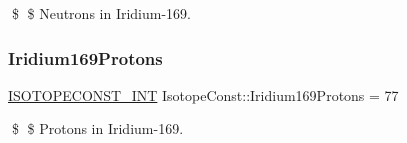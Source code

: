 \$ \$ Neutrons in Iridium-\/169. \mbox{\label{group___isotope_const-_iridium-_ir169_gae01019ec672aac7f7d9399dc2bbdf51f}} 
\subsubsection{\texorpdfstring{Iridium169\+Protons}{Iridium169Protons}}
{\footnotesize\ttfamily \mbox{\hyperlink{group___isotope_const-_macros_ga5f18360b3e99483a35c32d789e62621c}{I\+S\+O\+T\+O\+P\+E\+C\+O\+N\+S\+T\+\_\+\+I\+NT}} Isotope\+Const\+::\+Iridium169\+Protons = 77}

\$ \$ Protons in Iridium-\/169. 
